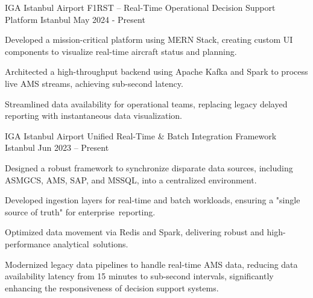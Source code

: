 
\begin{cventries}

\cventry
  {IGA Istanbul Airport}
  {F1RST – Real-Time Operational Decision Support Platform}
  {Istanbul}
  {May 2024 - Present}
  {
    \begin{cvitems}
      \item {Developed a mission-critical platform using MERN Stack, creating custom UI components to visualize real-time aircraft status and planning.}
      \item {Architected a high-throughput backend using Apache Kafka and Spark to process live AMS streams, achieving sub-second latency.}
      \item {Streamlined data availability for operational teams, replacing legacy delayed reporting with instantaneous data visualization.}
    \end{cvitems}
  }
    \cventry
    {IGA Istanbul Airport}
    {Unified Real-Time \& Batch Integration Framework}
    {Istanbul}
    {Jun 2023 – Present}
    {
      \begin{cvitems}
        \item {Designed a robust framework to synchronize disparate data sources, including ASMGCS, AMS, SAP, and MSSQL, into a centralized environment.}
        \item {Developed ingestion layers for real-time and batch workloads, ensuring a "single source of truth" for enterprise~reporting.}
      \item {Optimized data movement via Redis and Spark, delivering robust and high-performance analytical~solutions.}
    \item {Modernized legacy data pipelines to handle real-time AMS data, reducing data availability latency from 15 minutes to sub-second intervals, significantly enhancing the responsiveness of decision support systems.}
      \end{cvitems}
    }


\end{cventries}
